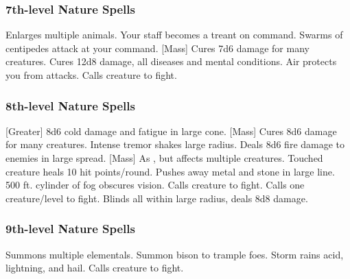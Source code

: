 \subsubsection{7th-level Nature Spells}
\begin{spelllist}
     Enlarges multiple animals.
     Your staff becomes a treant on command.
     Swarms of centipedes attack at your command.
    [Mass] Cures 7d6 damage for many creatures.
     Cures 12d8 damage, all diseases and mental conditions.
     Air protects you from attacks. 
     Calls creature to fight.
\end{spelllist}

\subsubsection{8th-level Nature Spells}
\begin{spelllist}
    [Greater] 8d6 cold damage and fatigue in large cone.
    [Mass] Cures 8d6 damage for many creatures.
     Intense tremor shakes large radius.
     Deals 8d6 fire damage to enemies in large spread.
    [Mass] As , but affects multiple creatures.
     Touched creature heals 10 hit points/round.
     Pushes away metal and stone in large line.
     500 ft. cylinder of fog obscures vision.
     Calls creature to fight.
     Calls one creature/level to fight.
     Blinds all within large radius, deals 8d8 damage.
\end{spelllist}

\subsubsection{9th-level Nature Spells}
\begin{spelllist}
     Summons multiple elementals.
     Summon bison to trample foes.
     Storm rains acid, lightning, and hail.
     Calls creature to fight.
\end{spelllist}

